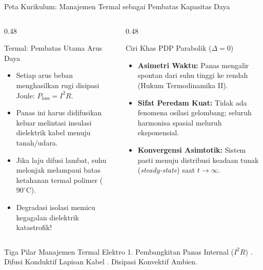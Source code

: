 \documentclass[aspectratio=169,10pt]{beamer}
\begin{document}
\begin{frame}{Peta Kurikulum: Manajemen Termal sebagai Pembatas Kapasitas Daya}
  \begin{columns}[t]
    \begin{column}{0.48\textwidth}
      \begin{block}{Termal: Pembatas Utama Arus Daya}
        \small
        \begin{itemize}
          \item Setiap arus beban menghasilkan rugi disipasi Joule: $P_{\text{loss}} = I^2 R$.
          \item Panas ini harus didifusikan keluar melintasi insulasi dielektrik kabel menuju tanah/udara.
          \item Jika laju difusi lambat, suhu melonjak melampaui batas ketahanan termal polimer ($90^\circ\text{C}$).
          \item Degradasi isolasi memicu kegagalan dielektrik katastrofik!
        \end{itemize}
      \end{block}
    \end{column}
    \begin{column}{0.48\textwidth}
      \begin{alertblock}{Ciri Khas PDP Parabolik ($\Delta = 0$)}
        \small
        \begin{itemize}
          \item \textbf{Asimetri Waktu:} Panas mengalir spontan dari suhu tinggi ke rendah (Hukum Termodinamika II).
          \item \textbf{Sifat Peredam Kuat:} Tidak ada fenomena osilasi gelombang; seluruh harmonisa spasial meluruh eksponensial.
          \item \textbf{Konvergensi Asimtotik:} Sistem pasti menuju distribusi keadaan tunak (\textit{steady-state}) saat $t \to \infty$.
        \end{itemize}
      \end{alertblock}
    \end{column}
  \end{columns}
  \vspace{0.05cm}
  \begin{exampleblock}{Tiga Pilar Manajemen Termal Elektro}
    \small
    1. Pembangkitan Panas Internal ($I^2 R$) . Difusi Konduktif Lapisan Kabel . Disipasi Konvektif Ambien.
  \end{exampleblock}
\end{frame}
\end{document}
